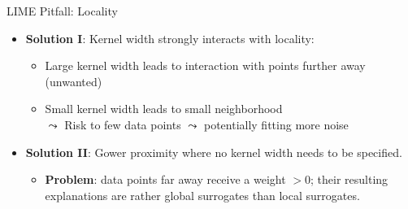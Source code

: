 \documentclass[11pt,compress,t,notes=noshow, aspectratio=169, xcolor=table]{beamer}
\begin{document}
\begin{vbframe}[c]{LIME Pitfall: Locality }
    \begin{itemize} 
         \item \textbf{Solution I}: Kernel width strongly interacts with locality:
         \begin{itemize}
             \item Large kernel width leads to interaction with points further away (unwanted)
             \item Small kernel width leads to small neighborhood\\
             $\leadsto$ Risk to few data points $\leadsto$ potentially fitting more noise
         \end{itemize}
    	\item \textbf{Solution II}: Gower proximity where no kernel width needs to be specified. 
    	\begin{itemize}
    	    \item \textbf{Problem}: data points far away receive a weight $ > 0$; their resulting explanations are rather global surrogates than local surrogates.   
    	\end{itemize}
    \end{itemize}
\vspace{0.3cm}

\end{vbframe}
\end{document}
